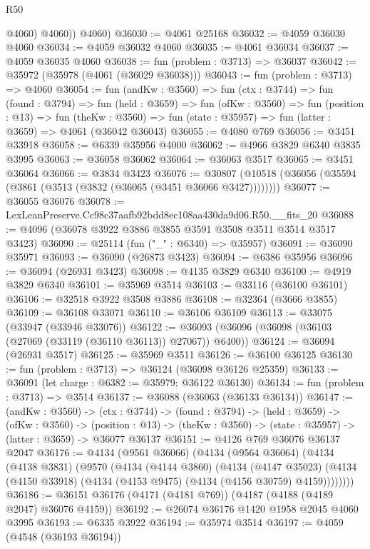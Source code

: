 \begin{lexlean}{R50}
\begin{coremodule}
            @4060)
          @4060))
      @4060)
@36030 := @4061 @25168
@36032 := @4059 @36030 @4060
@36034 := @4059 @36032 @4060
@36035 := @4061 @36034
@36037 := @4059 @36035 @4060
@36038 := fun (problem : @3713) => @36037
@36042 := @35972 (@35978 (@4061 (@36029 @36038)))
@36043 := fun (problem : @3713) => @4060
@36054 := fun (andKw : @3560) =>
  fun (ctx : @3744) =>
  fun (found : @3794) =>
  fun (held : @3659) =>
  fun (ofKw : @3560) =>
  fun (position : @13) =>
  fun (theKw : @3560) => fun (state : @35957) => fun (latter : @3659) => @4061 (@36042 @36043)
@36055 := @4080 @769
@36056 := @3451 @33918
@36058 := @6339 @35956 @4000
@36062 := @4966 @3829 @6340 @3835 @3995
@36063 := @36058 @36062
@36064 := @36063 @3517
@36065 := @3451 @36064
@36066 := @3834 @3423
@36076 := @30807 (@10518 (@36056 (@35594 (@3861 (@3513 (@3832 (@36065 (@3451 @36066 @3427))))))))
@36077 := @36055 @36076
@36078 := LexLeanPreserve.Cc98c37aafb92bdd8ec108aa430da9d06.R50.__fits_20
@36088 := @4096 (@36078 @3922 @3886 @3855 @3591 @3508 @3511 @3514 @3517 @3423)
@36090 := @25114 (fun ("_" : @6340) => @35957)
@36091 := @36090 @35971
@36093 := @36090 (@26873 @3423)
@36094 := @6386 @35956
@36096 := @36094 (@26931 @3423)
@36098 := @4135 @3829 @6340
@36100 := @4919 @3829 @6340
@36101 := @35969 @3514
@36103 := @33116 (@36100 @36101)
@36106 := @32518 @3922 @3508 @3886
@36108 := @32364 (@3666 @3855)
@36109 := @36108 @33071
@36110 := @36106 @36109
@36113 := @33075 (@33947 (@33946 @33076))
@36122 := @36093 (@36096 (@36098 (@36103 (@27069 (@33119 (@36110 @36113)) @27067)) @6400))
@36124 := @36094 (@26931 @3517)
@36125 := @35969 @3511
@36126 := @36100 @36125
@36130 := fun (problem : @3713) => @36124 (@36098 @36126 @25359)
@36133 := @36091 (let charge : @6382 := @35979; @36122 @36130)
@36134 := fun (problem : @3713) => @3514
@36137 := @36088 (@36063 (@36133 @36134))
@36147 := (andKw : @3560) ->
  (ctx : @3744) ->
  (found : @3794) ->
  (held : @3659) ->
  (ofKw : @3560) ->
  (position : @13) -> (theKw : @3560) -> (state : @35957) -> (latter : @3659) -> @36077 @36137
@36151 := @4126 @769 @36076 @36137 @2047
@36176 := @4134
    (@9561 @36066)
    (@4134
      (@9564 @36064)
      (@4134
        (@4138 @3831)
        (@9570
          (@4134
            (@4144 @3860)
            (@4134
              (@4147 @35023)
              (@4134 (@4150 @33918) (@4134 (@4153 @9475) (@4134 (@4156 @30759) @4159))))))))
@36186 := @36151 @36176 (@4171 (@4181 @769)) (@4187 (@4188 (@4189 @2047) @36076 @4159))
@36192 := @26074 @36176 @1420 @1958 @2045 @4060 @3995
@36193 := @6335 @3922
@36194 := @35974 @3514
@36197 := @4059 (@4548 (@36193 @36194))

\end{coremodule}
\end{lexlean}
